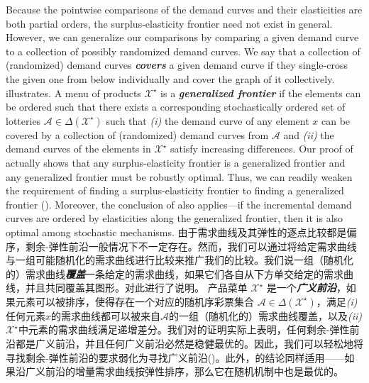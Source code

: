 \documentclass[12pt,letterpaper]{article}
\newenvironment{original}{\color{black}\noindent}{}
\newenvironment{translation}{\color{blue}\noindent}{}
\theoremstyle{plain}
\theoremstyle{definition}
\theoremstyle{remark}
\newcommand{\A}{\mathcal{A}}
\renewcommand{\1}{\mathds{1}}
\newcommand{\X}{\mathcal{X}}
\theoremstyle{definition}
\begin{document}
\begin{original}
Because the pointwise comparisons of the demand curves and their elasticities are both partial orders, the surplus-elasticity frontier need not exist in general. However, we can generalize our comparisons by comparing a given demand curve to a collection of possibly randomized demand curves. We say that a collection of (randomized) demand curves \textit{\textbf{covers}} a given demand curve if they single-cross the given one from below individually and cover the graph of it collectively.  illustrates.
A menu of products $\X^\star$ is a \textit{\textbf{generalized frontier}} if the elements can be ordered such that there exists a corresponding stochastically ordered set of lotteries $\A \in \Delta(\X^\star)$ such that \textit{(i)} the demand curve of any element $x$ can be covered by a collection of (randomized) demand curves from $\A$ and \textit{(ii)} the demand curves of the elements in $\X^\star$ satisfy increasing differences. Our proof of  actually shows that any surplus-elasticity frontier is a generalized frontier and any generalized frontier must be robustly optimal. Thus, we can readily weaken the requirement of finding a surplus-elasticity frontier to finding a generalized frontier  (). Moreover, the conclusion of  also applies---if the incremental demand curves are ordered by elasticities along the generalized frontier, then it is also optimal among stochastic mechanisms.
\end{original}
\begin{translation}
由于需求曲线及其弹性的逐点比较都是偏序，剩余-弹性前沿一般情况下不一定存在。然而，我们可以通过将给定需求曲线与一组可能随机化的需求曲线进行比较来推广我们的比较。我们说一组（随机化的）需求曲线\textit{\textbf{覆盖}}一条给定的需求曲线，如果它们各自从下方单交给定的需求曲线，并且共同覆盖其图形。对此进行了说明。
产品菜单 $\X^\star$ 是一个\textit{\textbf{广义前沿}}，如果元素可以被排序，使得存在一个对应的随机序彩票集合 $\A \in \Delta(\X^\star)$，满足\textit{(i)} 任何元素$x$的需求曲线都可以被来自$\A$的一组（随机化的）需求曲线覆盖，以及\textit{(ii)} $\X^\star$中元素的需求曲线满足递增差分。我们对的证明实际上表明，任何剩余-弹性前沿都是广义前沿，并且任何广义前沿必然是稳健最优的。因此，我们可以轻松地将寻找剩余-弹性前沿的要求弱化为寻找广义前沿()。此外，的结论同样适用——如果沿广义前沿的增量需求曲线按弹性排序，那么它在随机机制中也是最优的。
\end{translation}
\end{document}
